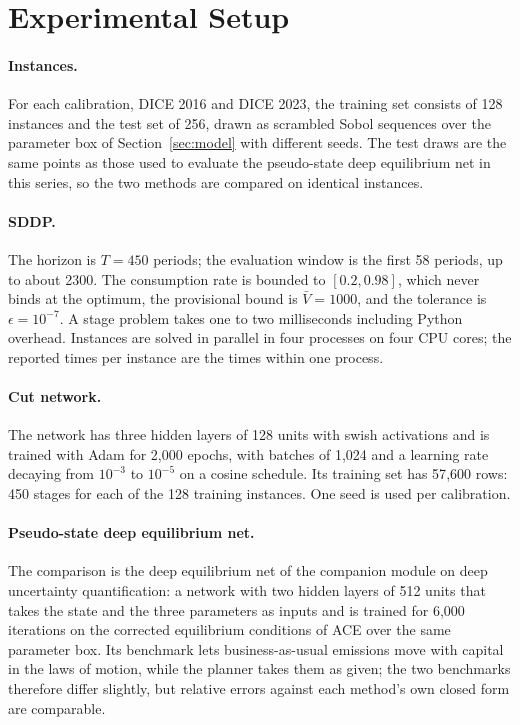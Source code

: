 \section{Experimental Setup}
\label{sec:setup}

\paragraph{Instances.} For each calibration, DICE 2016 and DICE 2023, the training set consists of 128 instances and the test set of 256, drawn as scrambled Sobol sequences over the parameter box of Section~\ref{sec:model} with different seeds. The test draws are the same points as those used to evaluate the pseudo-state deep equilibrium net in this series, so the two methods are compared on identical instances.

\paragraph{SDDP.} The horizon is $T = 450$ periods; the evaluation window is the first 58 periods, up to about 2300. The consumption rate is bounded to $[0.2, 0.98]$, which never binds at the optimum, the provisional bound is $\bar V = 1000$, and the tolerance is $\epsilon = 10^{-7}$. A stage problem takes one to two milliseconds including Python overhead. Instances are solved in parallel in four processes on four CPU cores; the reported times per instance are the times within one process.

\paragraph{Cut network.} The network has three hidden layers of 128 units with swish activations and is trained with Adam \parencite{kingma2017adam} for 2{,}000 epochs, with batches of 1{,}024 and a learning rate decaying from $10^{-3}$ to $10^{-5}$ on a cosine schedule. Its training set has 57{,}600 rows: 450 stages for each of the 128 training instances. One seed is used per calibration.

\paragraph{Pseudo-state deep equilibrium net.} The comparison is the deep equilibrium net of the companion module on deep uncertainty quantification: a network with two hidden layers of 512 units that takes the state and the three parameters as inputs and is trained for 6{,}000 iterations on the corrected equilibrium conditions of ACE over the same parameter box. Its benchmark lets business-as-usual emissions move with capital in the laws of motion, while the planner takes them as given; the two benchmarks therefore differ slightly, but relative errors against each method's own closed form are comparable.


